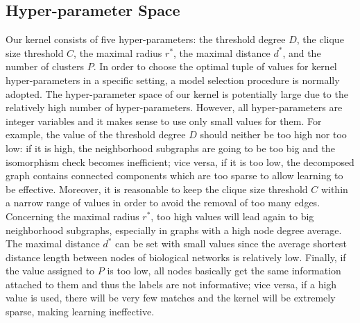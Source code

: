 \documentclass[review]{elsarticle}
\begin{document}
\subsection{Hyper-parameter Space}\label{hyper}
Our kernel consists of five hyper-parameters: the threshold degree $D$, the clique size threshold $C$, the maximal radius $r^*$, the maximal distance $d^*$, and the number of clusters $P$. In order to choose the optimal tuple of   values for kernel hyper-parameters in a specific setting, a model selection procedure is normally adopted. The hyper-parameter space of our kernel is potentially large due to the relatively high number of hyper-parameters. However, all hyper-parameters are integer variables and it makes sense to use only small values for them. For example, the value of the threshold degree $D$ should neither be too high nor too low: if it is high, the neighborhood subgraphs are going to be too big and the isomorphism check becomes inefficient; vice versa, if it is too low, the decomposed graph contains connected components which are too sparse to allow learning to be effective. Moreover, it is reasonable to keep the clique size threshold $C$ 
within a narrow range of values in order to avoid the removal of too many edges. Concerning the maximal radius $r^*$,  too  high values will lead again to big neighborhood subgraphs, especially in graphs with a high node degree average. The maximal distance $d^*$ can be set with small values since the average shortest distance length between nodes of biological networks is relatively low. Finally, if the value assigned to $P$ is too low, all nodes basically get the same information attached to them and thus the labels are not informative; vice versa, if a high value is used, there will be very few matches and the kernel will be extremely sparse, making learning ineffective.

\end{document}
